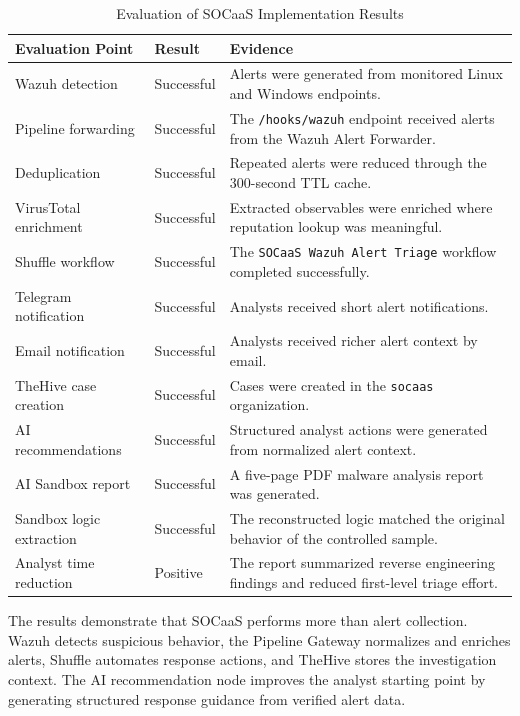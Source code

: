 \begin{table}[H]
\centering
\caption{Evaluation of SOCaaS Implementation Results}
\label{tab:ch4-evaluation-results}
\renewcommand{\arraystretch}{1.35}
\begin{tabularx}{\textwidth}{>{\RaggedRight\arraybackslash}p{4cm} >{\RaggedRight\arraybackslash}p{2.6cm} X}
\toprule
\rowcolor{tableheader}
\textbf{Evaluation Point} & \textbf{Result} & \textbf{Evidence} \\
\midrule
Wazuh detection & Successful & Alerts were generated from monitored Linux and Windows endpoints. \\
\midrule
Pipeline forwarding & Successful & The \texttt{/hooks/wazuh} endpoint received alerts from the Wazuh Alert Forwarder. \\
\midrule
Deduplication & Successful & Repeated alerts were reduced through the 300-second TTL cache. \\
\midrule
VirusTotal enrichment & Successful & Extracted observables were enriched where reputation lookup was meaningful. \\
\midrule
Shuffle workflow & Successful & The \texttt{SOCaaS Wazuh Alert Triage} workflow completed successfully. \\
\midrule
Telegram notification & Successful & Analysts received short alert notifications. \\
\midrule
Email notification & Successful & Analysts received richer alert context by email. \\
\midrule
TheHive case creation & Successful & Cases were created in the \texttt{socaas} organization. \\
\midrule
AI recommendations & Successful & Structured analyst actions were generated from normalized alert context. \\
\midrule
AI Sandbox report & Successful & A five-page PDF malware analysis report was generated. \\
\midrule
Sandbox logic extraction & Successful & The reconstructed logic matched the original behavior of the controlled sample. \\
\midrule
Analyst time reduction & Positive & The report summarized reverse engineering findings and reduced first-level triage effort. \\
\bottomrule
\end{tabularx}
\end{table}

The results demonstrate that SOCaaS performs more than alert collection. Wazuh detects suspicious behavior, the Pipeline Gateway normalizes and enriches alerts, Shuffle automates response actions, and TheHive stores the investigation context. The AI recommendation node improves the analyst starting point by generating structured response guidance from verified alert data.

